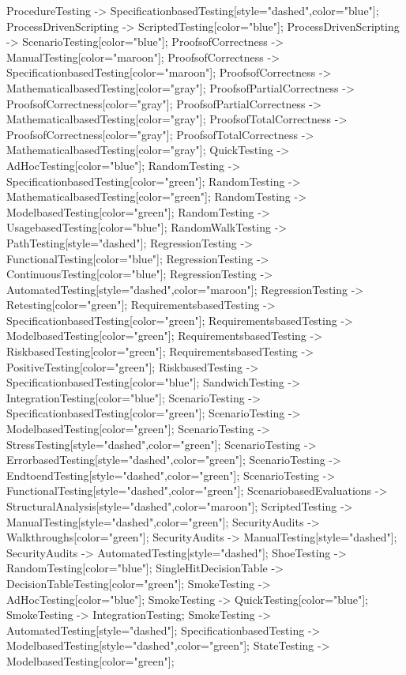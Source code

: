 \documentclass{article}
\begin{document}
{ProcedureTesting -> SpecificationbasedTesting[style="dashed",color="blue"];
ProcessDrivenScripting -> ScriptedTesting[color="blue"];
ProcessDrivenScripting -> ScenarioTesting[color="blue"];
ProofsofCorrectness -> ManualTesting[color="maroon"];
ProofsofCorrectness -> SpecificationbasedTesting[color="maroon"];
ProofsofCorrectness -> MathematicalbasedTesting[color="gray"];
ProofsofPartialCorrectness -> ProofsofCorrectness[color="gray"];
ProofsofPartialCorrectness -> MathematicalbasedTesting[color="gray"];
ProofsofTotalCorrectness -> ProofsofCorrectness[color="gray"];
ProofsofTotalCorrectness -> MathematicalbasedTesting[color="gray"];
QuickTesting -> AdHocTesting[color="blue"];
RandomTesting -> SpecificationbasedTesting[color="green"];
RandomTesting -> MathematicalbasedTesting[color="green"];
RandomTesting -> ModelbasedTesting[color="green"];
RandomTesting -> UsagebasedTesting[color="blue"];
RandomWalkTesting -> PathTesting[style="dashed"];
RegressionTesting -> FunctionalTesting[color="blue"];
RegressionTesting -> ContinuousTesting[color="blue"];
RegressionTesting -> AutomatedTesting[style="dashed",color="maroon"];
RegressionTesting -> Retesting[color="green"];
RequirementsbasedTesting -> SpecificationbasedTesting[color="green"];
RequirementsbasedTesting -> ModelbasedTesting[color="green"];
RequirementsbasedTesting -> RiskbasedTesting[color="green"];
RequirementsbasedTesting -> PositiveTesting[color="green"];
RiskbasedTesting -> SpecificationbasedTesting[color="blue"];
SandwichTesting -> IntegrationTesting[color="blue"];
ScenarioTesting -> SpecificationbasedTesting[color="green"];
ScenarioTesting -> ModelbasedTesting[color="green"];
ScenarioTesting -> StressTesting[style="dashed",color="green"];
ScenarioTesting -> ErrorbasedTesting[style="dashed",color="green"];
ScenarioTesting -> EndtoendTesting[style="dashed",color="green"];
ScenarioTesting -> FunctionalTesting[style="dashed",color="green"];
ScenariobasedEvaluations -> StructuralAnalysis[style="dashed",color="maroon"];
ScriptedTesting -> ManualTesting[style="dashed",color="green"];
SecurityAudits -> Walkthroughs[color="green"];
SecurityAudits -> ManualTesting[style="dashed"];
SecurityAudits -> AutomatedTesting[style="dashed"];
ShoeTesting -> RandomTesting[color="blue"];
SingleHitDecisionTable -> DecisionTableTesting[color="green"];
SmokeTesting -> AdHocTesting[color="blue"];
SmokeTesting -> QuickTesting[color="blue"];
SmokeTesting -> IntegrationTesting;
SmokeTesting -> AutomatedTesting[style="dashed"];
SpecificationbasedTesting -> ModelbasedTesting[style="dashed",color="green"];
StateTesting -> ModelbasedTesting[color="green"];
}
\end{document}
